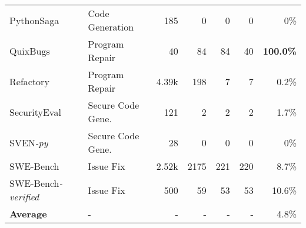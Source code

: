 \begin{table}[t]
{{\begin{tabular}{llrrrrr}
PythonSaga~\cite{PythonSaga} & Code Generation & 185 & 0 & 0 & 0 & 0\% \\
QuixBugs~\cite{QuixBugs} & Program Repair & 40 & 84 & 84 & 40 & \cellcolor{red!100} \textbf{100.0\%} \\
Refactory~\cite{Refactory} & Program Repair & 4.39k & 198 & 7 & 7 & \cellcolor{red!0.4} 0.2\% \\
SecurityEval~\cite{SecurityEval} & Secure Code Gene. & 121 & 2 & 2 & 2 & \cellcolor{red!3.4} 1.7\% \\
SVEN\textit{-py}~\cite{SVEN} & Secure Code Gene. & 28 & 0 & 0 & 0 & 0\% \\
SWE-Bench~\cite{SWE-bench} & Issue Fix & 2.52k & 2175 & 221 & 220 & \cellcolor{red!17.4} 8.7\% \\
SWE-Bench\textit{-verified}~\cite{SWE-bench-verified}  & Issue Fix & 500 & 59 & 53 & 53 & \cellcolor{red!21.2} 10.6\% \\ \hline
\textbf{Average} & - & - & - & - & - & 4.8\% \\
\bottomrule
\end{tabular}
}} \vspace{-0.4cm}
\end{table}